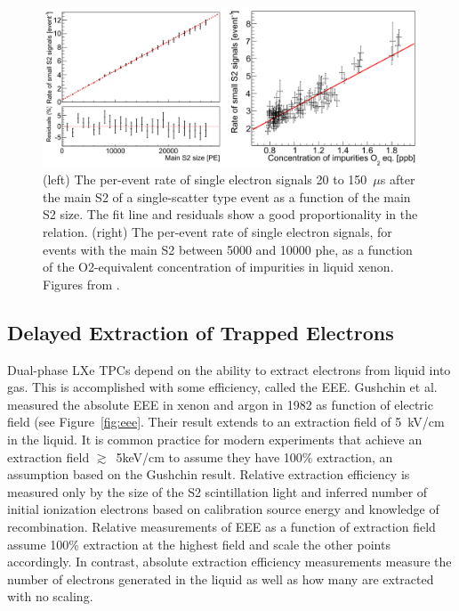 \begin{figure}[htbp]
\begin{center}
\includegraphics[width=\textwidth]{figures/etrains/electron_rates.png}
\caption{(left) The per-event rate of single electron signals 20 to 150~$\mu$s after the main S2 of a single-scatter type event as a function of the main S2 size. The fit line and residuals show a good proportionality in the relation. (right) The per-event rate of single electron signals, for events with the main S2 between 5000 and 10000 phe, as a function of the O2-equivalent concentration of impurities in liquid xenon. Figures from \cite{Aprile2014}.}
\label{fig:xenon10_s2s}
\end{center}
\end{figure}


\subsection{Delayed Extraction of Trapped Electrons} 
Dual-phase \ac{LXe} \ac{TPC}s depend on the ability to extract electrons from liquid into gas. This is accomplished with some efficiency, called the \ac{EEE}. Gushchin et al. measured the absolute \ac{EEE} in xenon and argon in 1982 as function of electric field  \cite{Gushchin1982} (see Figure~\ref{fig:eee}. Their result extends to an extraction field of 5~kV/cm in the liquid. It is common practice for modern experiments that achieve an extraction field $\gtrsim$~5keV/cm to assume they have 100\% extraction, an assumption based on the Gushchin result. Relative extraction efficiency is measured only by the size of the S2 scintillation light and inferred number of initial ionization electrons based on calibration source energy and knowledge of recombination. Relative measurements of \ac{EEE} as a function of extraction field assume 100\% extraction at the highest field and scale the other points accordingly. In contrast, absolute extraction efficiency measurements measure the number of electrons generated in the liquid as well as how many are extracted with no scaling. 

